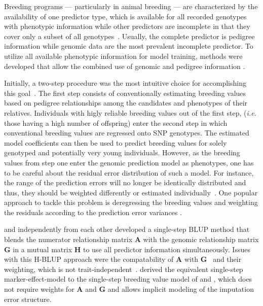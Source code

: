 \documentclass[12pt,titlepage]{article}
\begin{document}
Breeding programs --- particularly in animal breeding --- are characterized by
the availability of one predictor type, which is available for all recorded
genotypes with phenotypic information while other predictors are incomplete in
that they cover only a subset of all genotypes~\cite{Fragomeni2015}.
Usually, the complete predictor is pedigree information while genomic data are
the most prevalent incomplete predictor.
To utilize all available phenotypic information for model training, methods were 
developed that allow the combined use of genomic and pedigree information 
\cite{Hayes2009a,VanRaden2009}.

Initially, a two-step procedure was the most intuitive choice for accomplishing
this goal~\cite{VanRaden2009}.
The first step consists of conventionally estimating breeding values based on
pedigree relationships among the candidates and phenotypes of their relatives.
Individuals with higly reliable breeding values out of the first step,
(\textit{i.e.} those having a high number of offspring) enter the second step in
which conventional breeding values are regressed onto SNP genotypes.
The estimated model coefficients can then be used to predict breeding values
for solely genotyped and potentially very young individuals.
However, as the breeding values from step one enter the genomic prediction
model as phenotypes, one has to be careful about the residual error
distribution of such a model.
For instance, the range of the prediction errors will no longer be identically
distributed and thus, they should be weighted differently or estimated 
individually~\cite{Aguilar2010}.
One popular approach to tackle this problem is deregressing the breeding
values and weighting the residuals according to the prediction error variances
\cite{Garrick2009}.

 and  independently from each other
developed a single-step BLUP method that blends the numerator relationship matrix
$\mathbf{A}$ with the genomic relationship matrix $\mathbf{G}$ in a mutual matrix
$\mathbf{H}$ to use all predictor information simultaneously.
Issues with this H-BLUP approach were the compatability of $\mathbf{A}$ with
$\mathbf{G}$~\cite{Christensen2012} and their weighting, which is not
trait-independent~\cite{Vitezica2011,Ashraf2016}.
 derived the equivalent single-step marker-effect-model to 
the single-step breeding value model of  and 
, which does not require weights for $\mathbf{A}$ and 
$\mathbf{G}$ and allows implicit modeling of the imputation error structure.
\end{document}
